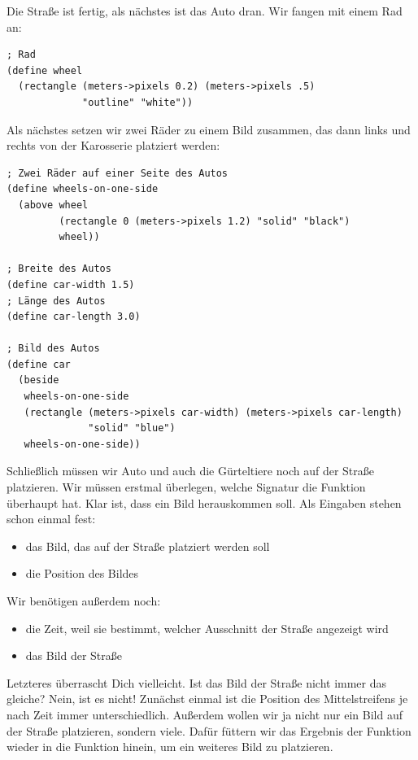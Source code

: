 Die Straße ist fertig, als nächstes ist das Auto dran.  Wir fangen mit
einem Rad an:
%
\begin{lstlisting}
; Rad
(define wheel
  (rectangle (meters->pixels 0.2) (meters->pixels .5)
             "outline" "white"))
\end{lstlisting}
%
Als nächstes setzen wir zwei Räder zu einem Bild zusammen, das dann
links und rechts von der Karosserie platziert werden:
%
\begin{lstlisting}
; Zwei Räder auf einer Seite des Autos
(define wheels-on-one-side
  (above wheel
         (rectangle 0 (meters->pixels 1.2) "solid" "black")
         wheel))

; Breite des Autos
(define car-width 1.5)
; Länge des Autos
(define car-length 3.0)
 
; Bild des Autos
(define car
  (beside
   wheels-on-one-side
   (rectangle (meters->pixels car-width) (meters->pixels car-length)
              "solid" "blue")
   wheels-on-one-side))
\end{lstlisting}
%
Schließlich müssen wir Auto und auch die Gürteltiere noch auf der
Straße platzieren.  Wir müssen erstmal überlegen, welche Signatur die
Funktion überhaupt hat.  Klar ist, dass ein Bild herauskommen soll.
Als Eingaben stehen schon einmal fest:
%
\begin{itemize}
\item das Bild, das auf der Straße platziert werden soll
\item die Position des Bildes
\end{itemize}
%
Wir benötigen außerdem noch:
%
\begin{itemize}
\item die Zeit, weil sie bestimmt, welcher Ausschnitt der Straße
  angezeigt wird
\item das Bild der Straße
\end{itemize}
%
Letzteres überrascht Dich vielleicht. Ist das Bild der Straße nicht
immer das gleiche?  Nein, ist es nicht!  Zunächst einmal ist die
Position des Mittelstreifens je nach Zeit immer unterschiedlich.
Außerdem wollen wir ja nicht nur ein Bild auf der Straße platzieren,
sondern viele.  Dafür füttern wir das Ergebnis der Funktion wieder in
die Funktion hinein, um ein weiteres Bild zu platzieren.

